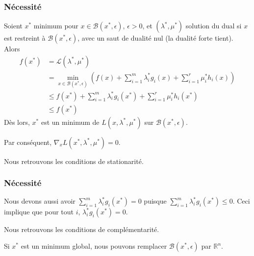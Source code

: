 \documentclass[usepdftitle=false]{beamer}
\def\cB{\mathcal{B}}
\def\cL{\mathcal{L}}
\def\RR{\mathbb{R}}
\begin{document}
\begin{frame}
	\frametitle{Nécessité}
	
	Soient $x^*$ minimum pour $x \in \cB(x^*,\epsilon)$, $\epsilon > 0$, et $(\lambda^*, \mu^*)$ solution du dual si $x$ est restreint à $\cB(x^*,\epsilon)$, avec un saut de dualité nul (la dualité forte tient).
	Alors
	\begin{align*}
		f(x^*) &= \cL(\lambda^*, \mu^*) \\
		&= \min_{x \in \cB(x^*,\epsilon)} \left( f(x) + \sum_{i = 1}^m \lambda_i^* g_i(x) + \sum_{i = 1}^r \mu_i^* h_i(x) \right) \\
		& \leq f(x^*) + \sum_{i = 1}^m \lambda_i^* g_i(x^*) + \sum_{i = 1}^r \mu_i^* h_i(x^*) \\
		& \leq f(x^*)
	\end{align*}
	Dès lors, $x^*$ est un minimum de $L(x, \lambda^*, \mu^*)$ sur $\cB(x^*,\epsilon)$.
	
	\mbox{}
	
	Par conséquent, $\nabla_x L(x^*, \lambda^*, \mu^*) = 0$.
	
	\mbox{}
	
	Nous retrouvons les conditions de stationarité.
	
\end{frame}

\begin{frame}
	\frametitle{Nécessité}
	
	Nous devons aussi avoir $\sum_{i = 1}^m \lambda_i^* g_i(x^*) = 0$ puisque $\sum_{i = 1}^m \lambda_i^* g_i(x^*) \leq 0$.
	Ceci implique que pour tout $i$, $\lambda_i^* g_i(x^*) = 0$.
	
	\mbox{}
	
	Nous retrouvons les conditions de complémentarité.
	
	\mbox{}
	
	Si $x^*$ est un minimum global, nous pouvons remplacer $\cB(x^*,\epsilon)$ par $\RR^n$.
	
\end{frame}
\end{document}
